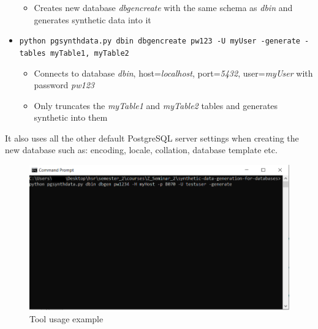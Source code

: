 \begin{itemize}
\begin{itemize}
		\item Creates new database \textit{dbgencreate} with the same schema as \textit{dbin} and generates synthetic data into it
	\end{itemize}
	\item \texttt{python pgsynthdata.py dbin dbgencreate pw123 -U myUser -generate -tables myTable1, myTable2}
	\begin{itemize}
		\item Connects to database \textit{dbin}, host=\textit{localhost}, port=\textit{5432}, user=\textit{myUser} with password \textit{pw123}
		\item Only truncates the \textit{myTable1} and \textit{myTable2} tables and generates synthetic into them
	\end{itemize}
\end{itemize}
\newpage
It also uses all the other default PostgreSQL server settings when creating the new database such as: encoding, locale, collation, database template etc.
\begin{figure}[H]
	\includegraphics[width=\linewidth]{./Figures/Implementation/tool_example_cmd.png}
	\caption{Tool usage example}
\end{figure}